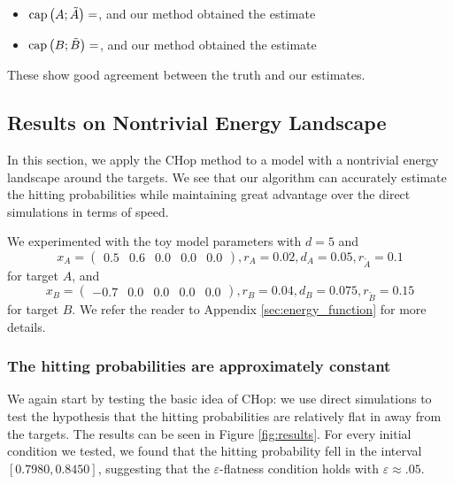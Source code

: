 \documentclass[english, aip, jcp, priprint, graphicx,floatfix]{revtex4-1}
\theoremstyle{plain}
\theoremstyle{definition}
\theoremstyle{plain}
\begin{document}
\begin{itemize}
\item $\mathrm{cap}\left(A;\tilde{A}\right)=$\TODOTHIS, and our method obtained the estimate \TODOTHIS
\item $\mathrm{cap}\left(B;\tilde{B}\right)=$\TODOTHIS, and our method obtained the estimate \TODOTHIS
\end{itemize}

These show good agreement between the truth and our estimates.

\subsection{Results on Nontrivial Energy Landscape}

In this section, we apply the CHop method to a model with a nontrivial energy landscape around the targets. We see that our algorithm can accurately estimate the hitting probabilities while maintaining great advantage over the direct simulations in terms of speed.

We experimented with the toy model parameters with $d = 5$ and
\begin{equation*}
x_A = \begin{pmatrix}%
0.5&0.6&0.0&0.0&0.0%
\end{pmatrix},
r_A = 0.02,
d_A = 0.05,
r_{\tilde{A}} = 0.1
\end{equation*}
for target $A$, and
\begin{equation*}
x_B = \begin{pmatrix}%
-0.7&0.0&0.0&0.0&0.0%
\end{pmatrix},
r_B = 0.04,
d_B = 0.075,
r_{\tilde{B}} = 0.15
\end{equation*}
for target $B$.  We refer the reader to Appendix \ref{sec:energy_function} for more details.

\subsubsection{The hitting probabilities are approximately constant}

We again start by testing the basic idea of CHop: we use direct simulations to test the hypothesis that the hitting probabilities are relatively flat in away from the targets.  The results can be seen in Figure \ref{fig:results}.   For every initial condition we tested, we found that the hitting probability fell in the interval $[0.7980, 0.8450]$, suggesting that the $\varepsilon$-flatness condition holds with $\varepsilon \approx .05$.
\end{document}
